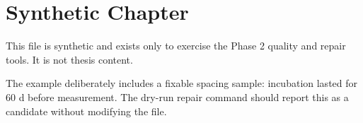 \chapter{Synthetic Chapter}

This file is synthetic and exists only to exercise the Phase 2 quality and
repair tools. It is not thesis content.

The example deliberately includes a fixable spacing sample: incubation lasted
for 60 d before measurement. The dry-run repair command should report this as a
candidate without modifying the file.

